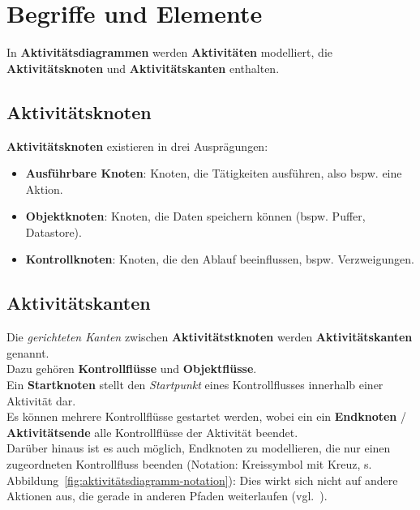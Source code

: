 \section{Begriffe und Elemente}\label{sec:aktivitaetsdiagramme-begriffe-und-elemente}

In \textbf{Aktivitätsdiagrammen} werden \textbf{Aktivitäten} modelliert, die \textbf{Aktivitätsknoten} und \textbf{Aktivitätskanten} enthalten.

\subsection{Aktivitätsknoten}

\textbf{Aktivitätsknoten} existieren in drei Ausprägungen:

\begin{itemize}
    \item \textbf{Ausführbare Knoten}: Knoten, die Tätigkeiten ausführen, also bspw. eine Aktion.
    \item \textbf{Objektknoten}: Knoten, die Daten speichern können (bspw. Puffer, Datastore).
    \item \textbf{Kontrollknoten}: Knoten, die den Ablauf beeinflussen, bspw. Verzweigungen.
\end{itemize}

\subsection{Aktivitätskanten}
Die \textit{gerichteten Kanten} zwischen \textbf{Aktivitätstknoten}  werden \textbf{Aktivitätskanten} genannt.\\
Dazu gehören \textbf{Kontrollflüsse} und \textbf{Objektflüsse}.\\

\noindent
Ein \textbf{Startknoten} stellt den \textit{Startpunkt} eines Kontrollflusses innerhalb einer Aktivität dar.\\
Es können mehrere Kontrollflüsse gestartet werden, wobei ein ein \textbf{Endknoten} / \textbf{Aktivitätsende} alle Kontrollflüsse der Aktivität beendet.\\

\noindent
Darüber hinaus ist es auch möglich, Endknoten zu modellieren, die nur einen zugeordneten Kontrollfluss beenden (Notation: Kreissymbol mit Kreuz, s. Abbildung~\ref{fig:aktivitätsdiagramm-notation}): Dies wirkt sich nicht auf andere Aktionen aus, die gerade in anderen Pfaden weiterlaufen (vgl.~\cite[72]{Bal05}).\\

